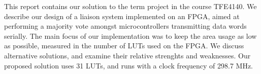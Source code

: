 This report contains our solution to the term project in the course
TFE4140. We describe our design of a liaison system implemented on an
FPGA, aimed at performing a majority vote amongst microcontrollers
transmitting data words serially. The main focus of our implementation
was to keep the area usage as low as possible, measured in the number
of LUTs used on the FPGA. We discuss alternative solutions, and
examine their relative strenghts and weaknesses.  Our proposed
solution uses 31 LUTs, and runs with a clock frequency of 298.7 MHz.
